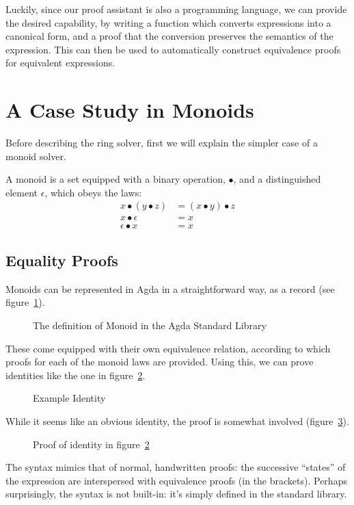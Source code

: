 \documentclass[draft, twocolumn]{article}
\begin{document}
Luckily, since our proof assistant is also a programming language, we can
provide the desired capability, by writing a function which converts expressions
into a canonical form, and a proof that the conversion preserves the semantics
of the expression. This can then be used to automatically construct equivalence
proofs for equivalent expressions.
\section{A Case Study in Monoids}
Before describing the ring solver, first we will explain the simpler case of a
monoid solver.

A monoid is a set equipped with a binary operation, \(\bullet\), and a
distinguished element \(\epsilon\), which obeys the laws:
\begin{align}
  x \bullet (y \bullet z) &= (x \bullet y) \bullet z \tag{Associativity} \\
  x \bullet \epsilon      &= x \tag{Left Identity} \\
  \epsilon \bullet x      &= x \tag{Right Identity}
\end{align}
\subsection{Equality Proofs}
Monoids can be represented in Agda in a straightforward way, as a record (see
figure~\ref{mon-def}).
\begin{figure}
  \caption{The definition of Monoid in the Agda Standard
    Library\cite{danielsson_agda_2018}}
  \label{mon-def}
\end{figure}

These come equipped with their own equivalence relation, according to which
proofs for each of the monoid laws are provided. Using this, we can prove
identities like the one in figure~\ref{mon-ident}.
\begin{figure}[h]
  \caption{Example Identity}
  \label{mon-ident}
\end{figure}

While it seems like an obvious identity, the proof is somewhat involved
(figure~\ref{mon-proof}).
\begin{figure}[!h]
  \caption{Proof of identity in figure~\ref{mon-ident}}
  \label{mon-proof}
\end{figure}

The syntax mimics that of normal, handwritten proofs: the successive ``states''
of the expression are interspersed with equivalence proofs (in the brackets).
Perhaps surprisingly, the syntax is not built-in: it's simply defined in the
standard library.
\end{document}
